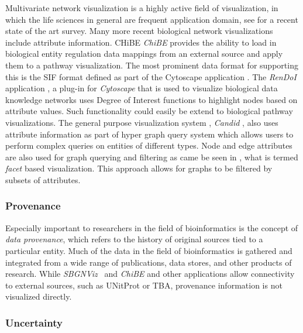 \documentclass[journal]{vgtc}                %
\begin{document}
 
Multivariate network visualization is a highly active field of visualization, in which the life sciences in general are frequent application domain, see \cite{} for a recent state of the art survey. 
Many more recent  biological network visualizations include attribute information.
CHiBE \textit{ChiBE}\cite{Babur2010chibe} provides the ability to load in biological entity regulation data mappings from an external source and apply them to a pathway visualization.
The most prominent data format for supporting this is the SIF format defined as part of the Cytoscape application \cite{Shannon2003cytoscape}. 
The \textit{RenDoI} application \cite{Vehlow2015}, a plug-in for \textit{Cytoscape} that is used to visualize  biological data knowledge networks uses Degree of Interest functions to highlight nodes based on attribute values.
Such functionality could easily be extend to biological pathway visualizations.
The general purpose visualization system , \textit{Candid} \cite{Shadoan2013}, also uses attribute information as part of hyper graph query system which allows users to perform complex queries on entities of different types.
Node and edge attributes are also used for graph querying and filtering as came be seen in , what is termed \textit{facet} based visualization. This approach allows for graphs to be filtered by subsets of attributes.



\subsubsection{Provenance}

Especially important to researchers in the field of bioinformatics is the concept of \textit{data provenance}, which refers to the history of original sources tied to a particular entity. Much of the data in the field of bioinformatics is gathered and integrated from a wide range of publications, data stores, and other products of research.
While \textit{SBGNViz}~\cite{SBGNViz2015} and \textit{ChiBE}\cite{Babur2010chibe} and other applications allow connectivity to external sources, such as UNitProt or TBA, provenance information is not visualized directly.


\subsubsection{Uncertainty}
\end{document}
